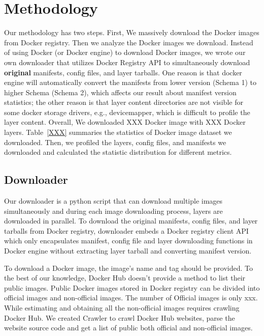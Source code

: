 
\section{Methodology}

Our methodology has two steps. First, We massively download the Docker images from Docker registry. Then we analyze the Docker images we download. Instead of using Docker (or Docker engine) to download Docker images, we wrote our own downloader that utilizes Docker Registry API to simultaneously download \textbf{original} manifests, config files, and layer tarballs. One reason is that docker engine will automatically convert the manifests from lower version (Schema 1) to higher Schema (Schema 2), which affects our result about manifest version statistics; the other reason is that layer content directories are not visible for some docker storage drivers, e.g., devicemapper, which is difficult to profile the layer content. Overall, We downloaded XXX Docker image with XXX Docker layers. Table~\ref{XXX} summaries the statistics of Docker image dataset we downloaded. Then, we profiled the layers, config files, and manifests we downloaded and calculated the statistic distribution for different metrics. 


\subsection{Downloader}

Our downloader is a python script that can download multiple images simultaneously and during each image downloading process, layers are downloaded in parallel. To download the original manifests, config files, and layer tarballs from Docker registry, downloader embeds a Docker registry client API~\cite{xxx} which only encapsulates manifest, config file and layer downloading functions in Docker engine without extracting layer tarball and converting manifest version. 

To download a Docker image, the image's name and tag should be provided. To the best of our knowledge, Docker Hub doesn't provide a method to list their public images. Public Docker images stored in Docker registry can be divided into official images and non-official images. The number of Official images is only xxx. While estimating and obtaining all the non-official images requires crawling Docker Hub. We created Crawler to crawl Docker Hub websites, parse the website source code and get a list of public both official and non-official images.

